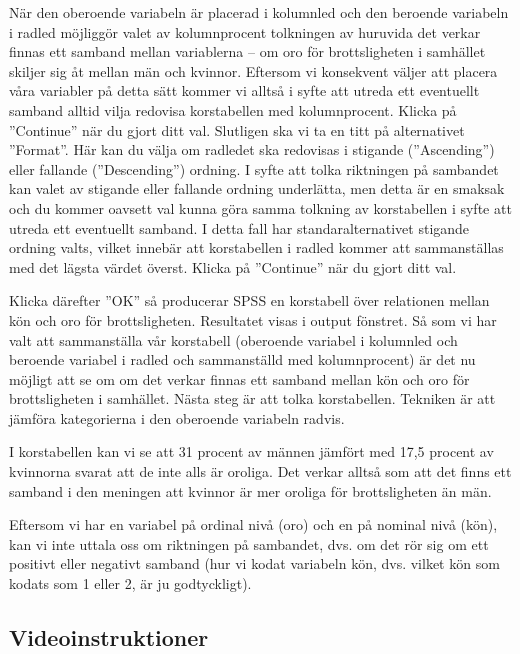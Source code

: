 \documentclass[
]{book}
\begin{document}
När den oberoende variabeln är placerad i kolumnled och den beroende variabeln i radled möjliggör
valet av kolumnprocent tolkningen av huruvida det verkar finnas ett samband mellan variablerna --
om oro för brottsligheten i samhället skiljer sig åt mellan män och kvinnor. Eftersom vi konsekvent
väljer att placera våra variabler på detta sätt kommer vi alltså i syfte att utreda ett eventuellt samband
alltid vilja redovisa korstabellen med kolumnprocent. Klicka på ''Continue'' när du gjort ditt val.
Slutligen ska vi ta en titt på alternativet ''Format''. Här kan du välja om radledet ska redovisas i stigande
(''Ascending'') eller fallande (''Descending'') ordning. I syfte att tolka riktningen på sambandet kan valet
av stigande eller fallande ordning underlätta, men detta är en smaksak och du kommer oavsett val
kunna göra samma tolkning av korstabellen i syfte att utreda ett eventuellt samband. I detta fall har
standaralternativet stigande ordning valts, vilket innebär att korstabellen i radled kommer att
sammanställas med det lägsta värdet överst. Klicka på ''Continue'' när du gjort ditt val.

Klicka därefter ''OK'' så producerar SPSS en korstabell över relationen mellan kön och oro för brottsligheten.
Resultatet visas i output fönstret. Så som vi har valt att sammanställa vår korstabell (oberoende variabel
i kolumnled och beroende variabel i radled och sammanställd med kolumnprocent) är det nu möjligt att
se om om det verkar finnas ett samband mellan kön och oro för brottsligheten i samhället. Nästa steg är
att tolka korstabellen. Tekniken är att jämföra kategorierna i den oberoende variabeln radvis.

I korstabellen kan vi se att 31 procent av männen jämfört med 17,5 procent av kvinnorna svarat att de
inte alls är oroliga. Det verkar alltså som att det finns ett samband i den meningen att kvinnor är mer
oroliga för brottsligheten än män.

Eftersom vi har en variabel på ordinal nivå (oro) och en på nominal nivå (kön), kan vi inte uttala oss om
riktningen på sambandet, dvs. om det rör sig om ett positivt eller negativt samband (hur vi kodat
variabeln kön, dvs. vilket kön som kodats som 1 eller 2, är ju godtyckligt).

\hypertarget{videoinstruktioner-6}{%
\subsection{Videoinstruktioner}\label{videoinstruktioner-6}}
\end{document}
